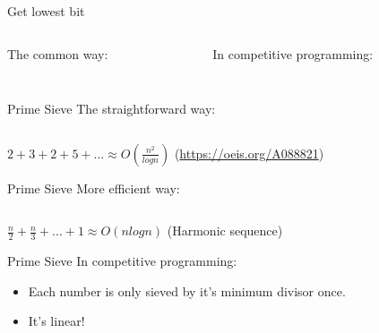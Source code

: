 \begin{frame}{Get lowest bit}
\begin{columns}
  \begin{column}{0.5\columnwidth}
   The common way:
  \inputminted[linenos=true, fontsize=\small, bgcolor=mygray, ]{python}{./src/lowb0.py}
  \end{column}
  \begin{column}{0.5\columnwidth}
     In competitive programming:
    \inputminted[linenos=true, fontsize=\small, bgcolor=mygray, ]{python}{./src/lowb.py}
  \end{column}
\end{columns}
\end{frame}

\begin{frame}{Prime Sieve}
 The straightforward way:
\inputminted[linenos=true, fontsize=\scriptsize, bgcolor=mygray, ]{python}{./src/prime0.py}
   \small $2+3+2+5+\ldots \approx O(\frac{n^2}{log n})$ (\url{https://oeis.org/A088821})
\end{frame}

\begin{frame}{Prime Sieve}
 More efficient way:
\inputminted[linenos=true, fontsize=\scriptsize, bgcolor=mygray, ]{python}{./src/prime1.py}
   \small $\frac{n}{2} + \frac{n}{3} + \ldots + 1 \approx O(nlogn)$ (Harmonic sequence)
\end{frame}

\begin{frame}{Prime Sieve}
   In competitive programming:
  \begin{itemize}
    \item<2-> \small Each number is only sieved by it's minimum divisor once.
    \item<3-> \small It's linear!
  \end{itemize}
  \inputminted[linenos=true, fontsize=\scriptsize, bgcolor=mygray, ]{python}{./src/prime2.py}
\end{frame}

